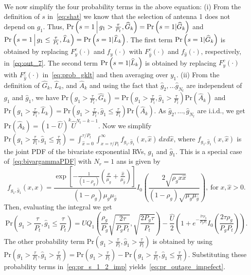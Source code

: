 \documentclass[12pt,draftcls,peerreview,onecolumn]{IEEEtran}
\newcommand{\brac}[1]{\left({#1}\right)}
\newcommand{\prob}[1]{\text{Pr}\brac{#1}}
\newcommand{\given}{\arrowvert}
\newcommand{\Given}{\Big\arrowvert}
\newcommand{\setA}{A}
\newcommand{\setAkhat}{\widehat{\setA}_k}
\newcommand{\setG}{G}
\newcommand{\setL}{L}
\newcommand{\setGkhat}{\widehat{\setG}_k}
\newcommand{\setLkhat}{\widehat{\setL}_k}
\newcommand{\mug}{{\mu_{g}}}
\newcommand{\Nt}{{N_t}}
\newcommand{\Nr}{{N_r}}
\newcommand{\Pt}{{P_t}}
\newcommand{\puch}{g}
\newcommand{\gk}[1]{{\puch_{#1}}}
\newcommand{\itau}{\tau}
\newcommand{\taubypt}{\frac{\itau}{\Pt}}
\newcommand{\gkgrtaubypt}[1]{{\gk{#1}}>\taubypt}
\newcommand{\gklttaubypt}[1]{{\gk{#1}}\leq\taubypt}
\newcommand{\gkhatgrtaubypt}[1]{{\gkhat{#1}}>\taubypt}
\newcommand{\gkhatlttaubypt}[1]{{\gkhat{#1}}\leq\taubypt}
\newcommand{\yk}[1]{y_{#1}}
\newcommand{\un}{U}
\newcommand{\unhat}{\widehat{\un}}
\newcommand{\gpilotpower}{P_g}
\newcommand{\ghat}{\hat{\puch}}
\newcommand{\yhat}{\hat{y}}
\newcommand{\gkhat}[1]{\ghat_{#1}}
\newcommand{\mughat}{\mu_{\ghat}}
\newcommand{\rhog}{\rho_g}
\newcommand{\ccdfyrv}[1]{ F^{c}_{y}\left(#1 \right) }
\newcommand{\ccdfyhatrv}[1]{F^{c}_{\yhat}\left(#1 \right) }
\newcommand{\pdfy}[1]{ f_{y}\left( #1 \right) }
\newcommand{\pdfyhat}[1]{f_{\yhat}\left( #1 \right) }
\newcommand{\xhat}{\hat{x}}
\begin{document}
We now simplify the four probability terms in the above equation:
(i) From the definition of $s$ in~\eqref{eq:shat} we know that the selection of antenna 1 does not depend on $\gk{1}$. Thus, $\prob{s = 1 \Given\gkgrtaubypt{1},\setGkhat}=\prob{s = 1 \given \setGkhat}$  and $\prob{s = 1 \Given \gklttaubypt{1},\setLkhat}=\prob{s = 1 \given \setLkhat}$. The first term $\prob{s = 1 \given \setGkhat}$ is obtained by replacing  $\ccdfyrv{\cdot}$ and $\pdfy{\cdot}$ with $\ccdfyhatrv{\cdot}$ and $\pdfyhat{\cdot}$, respectively, in~\eqref{eq:out_7}. The second term $\prob{s=1 \given \setLkhat}$ is obtained by replacing $\ccdfyrv{\cdot}$ with $\ccdfyhatrv{\cdot}$ in~\eqref{eq:prob_gklt} and then averaging over $\yk{1}$. 
(ii) From the definition of $\setGkhat$, $\setLkhat$, and $\setAkhat$ and using the fact that $\gkhat{2},\ldots\gkhat{\Nt}$ are independent of $\gk{1}$ and $\gkhat{1}$, we have  $\prob{\gkgrtaubypt{1},\setGkhat} =\prob{\gkgrtaubypt{1},\gkhatgrtaubypt{1}}\prob{\setAkhat}$ and $\prob{\gkgrtaubypt{1},\setLkhat} =\prob{\gkgrtaubypt{1},\gkhatlttaubypt{1}}\prob{\setAkhat}$. As $\gkhat{2},\ldots,\gkhat{\Nt}$ are i.i.d., we get $\prob{\setAkhat}=\left(1- \unhat \right)^{k} \unhat^{\Nt-k-1} $. Now we simplify $\prob{\gkgrtaubypt{1},\gkhatlttaubypt{1}}=\int_{\xhat=0}^{\tau/\Pt}\int_{x=\tau/\Pt}^{\infty}f_{\gk{1},\gkhat{1}}\left(x,\xhat \right)\,dx d\xhat$, where $f_{\gk{1},\gkhat{1}}\left(x,\xhat \right)$ is the joint PDF of the bivariate exponential RVs, $\gk{1}$ and $\gkhat{1}$. This is a special case of~\eqref{eq:bivargammaPDF} with $\Nr=1$ ans is given by
\begin{equation}
\label{eq:bivargPDF}
f_{\gk{1},\gkhat{1}}\left(x,\xhat \right) = \frac{\exp\left[{-\frac{1}{(1-\rhog)}\left( \frac{x}{\mug}+\frac{\xhat}{\mughat}\right) } \right]}{\left(1-\rhog \right)\mug\mughat}  I_{0}\left(\frac{2\sqrt{\rhog x\xhat}}{(1-\rhog)\sqrt{\mug\mughat}}\right),~\text{for}\; x,\xhat>0.
\end{equation}
Then, evaluating the integral we get 
\begin{equation}
\prob{\gkgrtaubypt{1},\gkhatlttaubypt{1}} =  \un Q_1\left(\frac{\rhog}{ \gpilotpower} \sqrt{\frac{2\itau}{ \gpilotpower\Pt}},\sqrt{\frac{2 \gpilotpower\itau}{\Pt}}\right)  - \frac{\unhat}{2} \left( 1 + e^{-\frac{2\itau\rhog}{ \gpilotpower\Pt}}I_{0}\left(\frac{2\itau\rhog}{ \gpilotpower\Pt} \right) \right).
\end{equation}
The other probability term $\prob{\gkgrtaubypt{1},\gkhatgrtaubypt{1}}$ is obtained by using $\prob{\gkgrtaubypt{1},\gkhatgrtaubypt{1}}= \prob{\gkgrtaubypt{1}} - \prob{\gkgrtaubypt{1},\gkhatlttaubypt{1}} $. Substituting these probability terms in~\eqref{eq:pr_s_1_2_imp} yields~\eqref{eq:pr_outage_impefect}.





%
\end{document}

